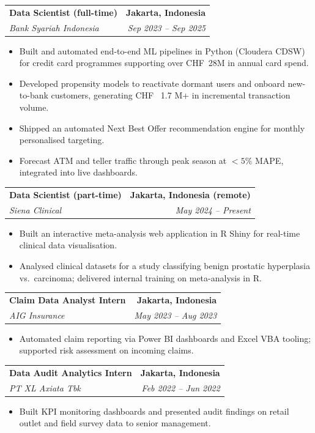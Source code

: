 \documentclass[10.5pt,a4paper]{article}
\makeatletter
\newcommand{\entry}[4]{%
  \noindent\begin{tabularx}{\linewidth}{@{}Xr@{}}
    \textbf{#1} & \textbf{#3} \\
    \textit{#2} & \textit{#4} \\
  \end{tabularx}\vspace{0.15em}
}
\newenvironment{bullets}
  {\begin{itemize}[leftmargin=1.1em,itemsep=0.12em,topsep=0.18em,parsep=0pt]}
  {\end{itemize}}
\makeatother
\begin{document}
\entry{Data Scientist (full-time)}{Bank Syariah Indonesia}{Jakarta, Indonesia}{Sep 2023 -- Sep 2025}
\begin{bullets}
  \item Built and automated end-to-end ML pipelines in Python (Cloudera CDSW) for credit
        card programmes supporting over CHF~28M in annual card spend.
  \item Developed propensity models to reactivate dormant users and onboard new-to-bank
        customers, generating 
        CHF~ 1.7 M+ in incremental transaction volume.
  \item Shipped an automated Next Best Offer recommendation engine for monthly personalised targeting.
  \item Forecast ATM and teller traffic through peak season at $<5\%$ MAPE, integrated into live dashboards.
\end{bullets}

\entry{Data Scientist (part-time)}{Siena Clinical}{Jakarta, Indonesia (remote)}{May 2024 -- Present}
\begin{bullets}
  \item Built an interactive meta-analysis web application in R Shiny for real-time clinical
        data visualisation.
  \item Analysed clinical datasets for a study classifying benign prostatic hyperplasia
        vs.\ carcinoma; delivered internal training on meta-analysis in R.
\end{bullets}

\entry{Claim Data Analyst Intern}{AIG Insurance}{Jakarta, Indonesia}{May 2023 -- Aug 2023}
\begin{bullets}
  \item Automated claim reporting via Power BI dashboards and Excel VBA tooling; supported
        risk assessment on incoming claims.
\end{bullets}

\entry{Data Audit Analytics Intern}{PT XL Axiata Tbk}{Jakarta, Indonesia}{Feb 2022 -- Jun 2022}
\begin{bullets}
  \item Built KPI monitoring dashboards and presented audit findings on retail outlet and
        field survey data to senior management.
\end{bullets}

 
\end{document}

